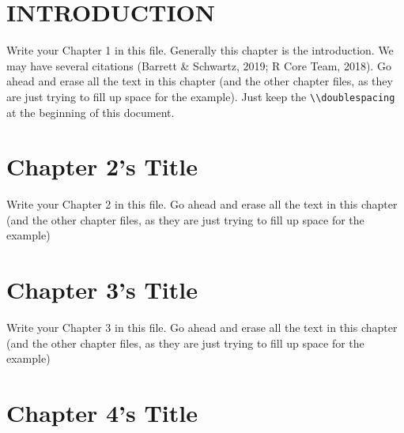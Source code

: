 \documentclass{DissertateUSU}
\begin{document}
\newpage
\fancyhead[R]{\thepage}
\fancyfoot[C]{}
\listoffigures

\newpage
{}

\newpage
\fancyhead[R]{\thepage}
\fancyfoot[C]{}

\chapter{INTRODUCTION}

\doublespacing

Write your Chapter 1 in this file. Generally this chapter is the
introduction. We may have several citations (Barrett \& Schwartz, 2019;
R Core Team, 2018). Go ahead and erase all the text in this chapter (and
the other chapter files, as they are just trying to fill up space for
the example). Just keep the
\texttt{\textbackslash{}\textbackslash{}doublespacing} at the beginning
of this document.

\lipsum

\FloatBarrier
\newpage
\fancyhead[R]{\thepage}
\fancyfoot[C]{}

\chapter{Chapter 2's Title}

\doublespacing

Write your Chapter 2 in this file. Go ahead and erase all the text in
this chapter (and the other chapter files, as they are just trying to
fill up space for the example)

\lipsum

\FloatBarrier
\newpage
\fancyhead[R]{\thepage}
\fancyfoot[C]{}

\chapter{Chapter 3's Title}

\doublespacing

Write your Chapter 3 in this file. Go ahead and erase all the text in
this chapter (and the other chapter files, as they are just trying to
fill up space for the example)

\lipsum

\FloatBarrier
\newpage
\fancyhead[R]{\thepage}
\fancyfoot[C]{}

\chapter{Chapter 4's Title}
\end{document}
